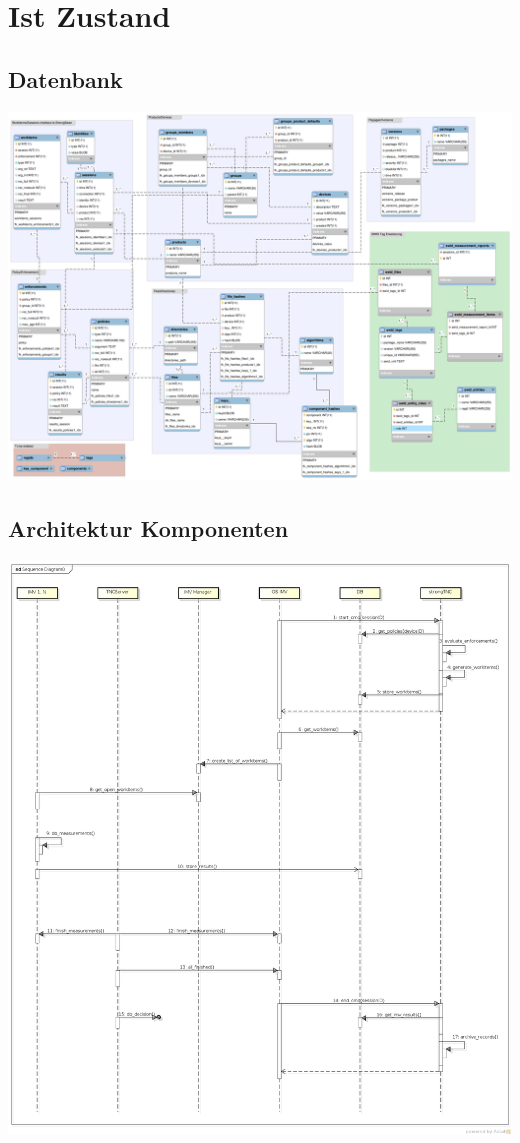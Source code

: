 \chapter{Ist Zustand}
\section{Datenbank}
\includegraphics[scale=0.25, angle=90]{images/db/database-model.png}
\section{Architektur Komponenten}
\includegraphics[width=\textwidth]{images/architecture/architecture_sequence_diagramm-2014-03-12}
